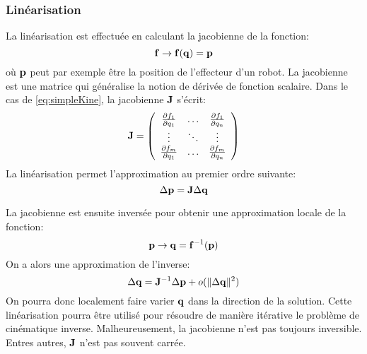 \subsubsection{Linéarisation}
La linéarisation est effectuée en calculant la jacobienne de la fonction:
\begin{equation}
  \mbf{f} \rightarrow \mbf{f}(\mbf{q}) = \mbf{p}
  \label{eq:simpleKine}
\end{equation}
\noindent où ${\mathbf{p}}$ peut par exemple être la position de l'effecteur d'un robot.
La jacobienne est une matrice qui généralise la notion de dérivée de fonction
scalaire. Dans le cas de \eqref{eq:simpleKine}, la jacobienne ${\mathbf{J}}$ s'écrit:
\begin{equation}
  \mbf{J} = \left(
  \begin{array}{ccc}
    \dpartial{f_1}{q_1} & \ldots & \dpartial{f_1}{q_n}\\
    \vdots & \ddots & \vdots \\
    \dpartial{f_m}{q_1} & \ldots & \dpartial{f_m}{q_n}
  \end{array}
  \right)
  \label{eq:Jacobian}
\end{equation}
La linéarisation permet l'approximation au premier ordre suivante:
\begin{equation}
  \Delta \mbf{p} = \mbf{J} \Delta \mbf{q}
  \label{eq:directKineLin}
\end{equation}

La jacobienne est ensuite inversée pour obtenir une approximation
locale de la fonction:
\begin{equation}
  \mbf{p} \rightarrow \mbf{q} = \mbf{f}^{-1}(\mbf{p})
  \label{eq:simpleInvKine}
\end{equation}
On a alors une approximation de l'inverse:
\begin{equation}
  \Delta \mbf{q} = \mbf{J}^{-1} \Delta \mbf{p} + o(\Vert \Delta\mbf{q} \Vert^2)
  \label{eq:ik}
\end{equation}
On pourra donc localement faire varier ${\mathbf{q}}$ dans la direction de la solution.
Cette linéarisation pourra être utilisé pour résoudre de manière itérative le problème 
de cinématique inverse.
Malheureusement, la jacobienne n'est pas toujours inversible. Entres autres, ${\mathbf{J}}$ n'est pas souvent carrée.

